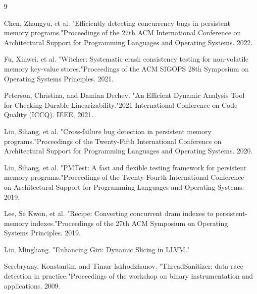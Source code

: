 \documentclass[a4paper,12pt]{article}
\begin{document}
\begin{thebibliography}{9}

Chen, Zhangyu, et al. "Efficiently detecting concurrency bugs in persistent memory programs."Proceedings of the 27th ACM International Conference on Architectural Support for Programming Languages and Operating Systems. 2022.

Fu, Xinwei, et al. "Witcher: Systematic crash consistency testing for non-volatile memory key-value stores."Proceedings of the ACM SIGOPS 28th Symposium on Operating Systems Principles. 2021.

Peterson, Christina, and Damian Dechev. "An Efficient Dynamic Analysis Tool for Checking Durable Linearizability."2021 International Conference on Code Quality (ICCQ). IEEE, 2021.

Liu, Sihang, et al. "Cross-failure bug detection in persistent memory programs."Proceedings of the Twenty-Fifth International Conference on Architectural Support for Programming Languages and Operating Systems. 2020.

Liu, Sihang, et al. "PMTest: A fast and flexible testing framework for persistent memory programs."Proceedings of the Twenty-Fourth International Conference on Architectural Support for Programming Languages and Operating Systems. 2019.

Lee, Se Kwon, et al. "Recipe: Converting concurrent dram indexes to persistent-memory indexes."Proceedings of the 27th ACM Symposium on Operating Systems Principles. 2019.


Liu, Mingliang. "Enhancing Giri: Dynamic Slicing in LLVM."

Serebryany, Konstantin, and Timur Iskhodzhanov. "ThreadSanitizer: data race detection in practice."Proceedings of the workshop on binary instrumentation and applications. 2009.




\end{thebibliography}
\end{document}
